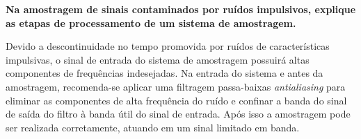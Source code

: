 \textbf{Na amostragem de sinais contaminados por ruídos impulsivos, explique as etapas de processamento de um sistema de amostragem.}

Devido a descontinuidade no tempo promovida por ruídos de características impulsivas, o sinal de entrada do sistema de amostragem possuirá altas componentes de frequências indesejadas. Na entrada do sistema e antes da amostragem, recomenda-se aplicar uma filtragem passa-baixas \textit{antialiasing} para eliminar as componentes de alta frequência do ruído e confinar a banda do sinal de saída do filtro à banda útil do sinal de entrada. Após isso a amostragem pode ser realizada corretamente, atuando em um sinal limitado em banda. 
